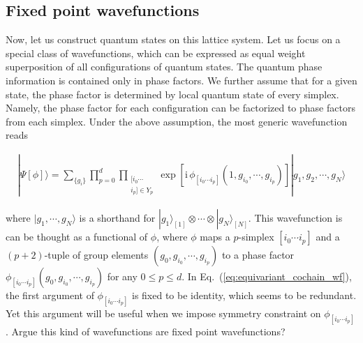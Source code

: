 \documentclass[%
  reprint,
  amsmath,amssymb,
  aps,pra,
]{revtex4-1}
\newcommand{\ii}{\mathrm{i}\,} %
\begin{document}
\subsection{Fixed point wavefunctions}
Now, let us construct quantum states on this lattice system.
Let us focus on a special class of wavefunctions, which can be expressed as equal weight superposition of all configurations of quantum states.
The quantum phase information is contained only in phase factors.
We further assume that for a given state, the phase factor is determined by local quantum state of every simplex. 
Namely, the phase factor for each configuration can be factorized to phase factors from each simplex.
Under the above assumption, the most generic wavefunction reads
\begin{widetext}
  \begin{align}
    |\Psi[\phi]\rangle=\sum_{\{g_i\}}\prod_{p=0}^d \prod_{\substack{[i_0 \cdots\\ i_{p}]\in Y_p}} \exp\left[ \ii \phi_{[i_0\cdots i_{p}]}(1,g_{i_0},\cdots,g_{i_{p}}) \right] |g_1,g_2,\cdots,g_N\rangle
    \label{eq:equivariant_cochain_wf}
  \end{align}
\end{widetext}
where $|g_1,\cdots,g_N\rangle$ is a shorthand for $|g_1\rangle_{[1]}\otimes\cdots\otimes|g_N\rangle_{[N]}$.
This wavefunction is can be thought as a functional of $\phi$, where $\phi$ maps a $p$-simplex $[i_0\cdots i_{p}]$ and a $(p+2)$-tuple of group elements $(g_0,g_{i_0},\cdots,g_{i_{p}})$ to a phase factor $\phi_{[i_0\cdots i_{p}]}(g_0,g_{i_0},\cdots,g_{i_{p}})$ for any $0\le p\le d$.
In Eq.~(\ref{eq:equivariant_cochain_wf}), the first argument of $\phi_{[i_0\cdots i_{p}]}$ is fixed to be identity, which seems to be redundant.
Yet this argument will be useful when we impose symmetry constraint on $\phi_{[i_0\cdots i_{p}]}$.
{\color{red} Argue this kind of wavefunctions are fixed point wavefunctions?}
\end{document}
